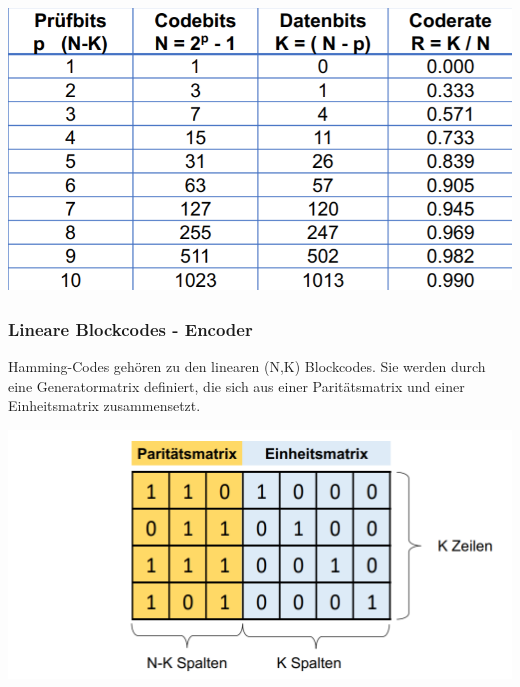 \begin{center}
    \includegraphics[width=1\linewidth]{images/hammingcodes.png}
\end{center}

\subsubsection{Lineare Blockcodes - Encoder}%
\label{ssub:lineare_blockcodes}
Hamming-Codes gehören zu den linearen (N,K) Blockcodes. Sie werden durch eine Generatormatrix definiert, die sich aus einer Paritätsmatrix und einer Einheitsmatrix zusammensetzt.

\begin{center}
    \includegraphics[width=1\linewidth]{images/linearbl.png}
\end{center}

